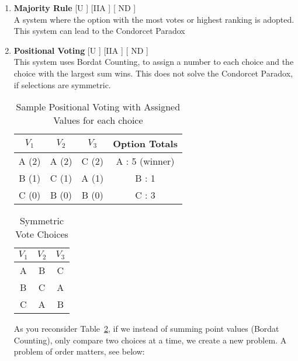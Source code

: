 \documentclass[twoside]{article}
\begin{document}
\begin{enumerate}
    \item \textbf{Majority Rule} [U \cmark] [IIA \xmark ] [ ND \cmark ]
    \\ A system where the option with the most votes or highest ranking is adopted.  This system can lead to the Condorcet Paradox
    \item \textbf{Positional Voting} [U \cmark] [IIA \xmark ] [ ND \cmark ]
    \\ This system uses Bordat Counting, to assign a number to each choice and the choice with the largest sum wins.  This does not solve the Condorcet Paradox, if selections are symmetric.
    
    \begin{table}[H]
    \centering
     \begin{tabular}{ccc|c}
     $V_1$ & $V_2$ & $V_3$ & Option Totals \\ \hline
     A (2) & A (2) & C (2) & A : 5 (winner) \\
     B (1) & C (1) & A (1) & B : 1 \\
     C (0) & B (0) & B (0) & C : 3 
    \end{tabular}
    \caption{Sample Positional Voting with Assigned Values for each choice}
    \label{tab:ex4}
\end{table}
    
    
\begin{table}[H]
    \centering
     \begin{tabular}{ccc}
     $V_1$ & $V_2$ & $V_3$  \\ \hline
     A  & B & C \\
     B  & C  & A \\
     C  & A  & B   
    \end{tabular}
    \caption{Symmetric Vote Choices}
    \label{tab:ex9}
\end{table}

As you reconsider Table~\ref{tab:ex9}, if we instead of summing point values (Bordat Counting), only compare two choices at a time, we create a new problem.  A problem of order matters, see below:

\begin{center}
\end{center}
\end{enumerate}
\end{document}
